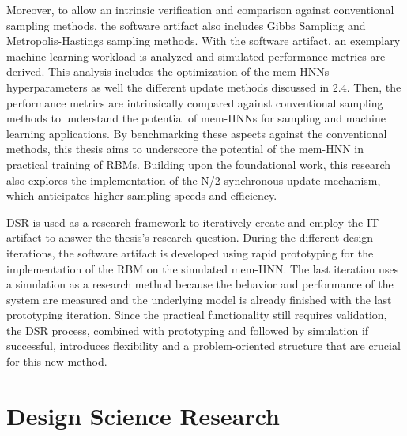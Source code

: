 Moreover, to allow an intrinsic verification and comparison against conventional sampling methods, the software artifact also includes Gibbs Sampling and Metropolis-Hastings sampling methods.
With the software artifact, an exemplary machine learning workload is analyzed and simulated performance metrics are derived.
This analysis includes the optimization of the \ac{mem-HNN}s hyperparameters as well the different update methods discussed in 2.4.
Then, the performance metrics are intrinsically compared against conventional sampling methods to understand the potential of \ac{mem-HNN}s for sampling and machine learning applications.
By benchmarking these aspects against the conventional methods, this thesis aims to underscore the potential of the \ac{mem-HNN} in practical training of \ac{RBM}s.
Building upon the foundational work, this research also explores the implementation of the N/2 synchronous update mechanism, which anticipates higher sampling speeds and efficiency.

\ac{DSR} is used as a research framework to iteratively create and employ the \ac{IT}-artifact to answer the thesis's research question. 
During the different design iterations, the software artifact is developed using rapid prototyping for the implementation of the \ac{RBM} on the simulated \ac{mem-HNN}.
The last iteration uses a simulation as a research method because the behavior and performance of the system are measured and the underlying model is already finished with the last prototyping iteration. 
Since the practical functionality still requires validation, the \ac{DSR} process,
combined with prototyping and followed by simulation if successful, introduces flexibility and a problem-oriented structure that are crucial for this new method.

\section{Design Science Research}

